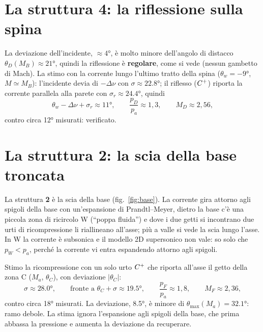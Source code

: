 \section*{La struttura 4: la riflessione sulla spina}

La deviazione dell'incidente, $\approx\ang{4}$, è molto minore dell'angolo di distacco $\theta_D(M_B)\approx\ang{21}$,
quindi la riflessione è \textbf{regolare}, come si vede (nessun gambetto di Mach). La stimo con la corrente lungo
l'ultimo tratto della spina ($\theta_w=\ang{-9}$, $M\simeq M_B$): l'incidente devia di $-\Delta\nu$ con
$\sigma\approx\ang{22.8}$; il riflesso ($C^{+}$) riporta la corrente parallela alla parete con $\sigma_r\approx\ang{24.4}$,
quindi
\[
\theta_w-\Delta\nu+\sigma_r\approx\ang{11},\qquad \frac{p_D}{p_a}\approx1{,}3,\qquad M_D\approx2{,}56 ,
\]
contro circa \ang{12} misurati: verificato.

\section*{La struttura 2: la scia della base troncata}
La struttura \textbf{2} è la scia della base (fig.~\ref{fig:base}). La corrente gira attorno agli spigoli della base con un'espansione di
Prandtl--Meyer, dietro la base c'è una piccola zona di ricircolo W (``poppa fluida'') e dove i due getti si incontrano
due urti di ricompressione li riallineano all'asse; più a valle si vede la scia lungo l'asse. In W la corrente è
subsonica e il modello 2D supersonico non vale: so solo che $p_W<p_a$, perché la corrente vi entra espandendo attorno
agli spigoli.

Stimo la ricompressione con un solo urto $C^{+}$ che riporta all'asse il getto della zona C ($M_a$, $\theta_C$), con
deviazione $|\theta_C|$:
\[
\sigma\approx\ang{28.0},\qquad \text{fronte a }\theta_C+\sigma\approx\ang{19.5},\qquad
\frac{p_F}{p_a}\approx1{,}8,\qquad M_F\approx2{,}36 ,
\]
contro circa \ang{18} misurati. La deviazione, \ang{8.5}, è minore di $\theta_{\max}(M_a)=\ang{32.1}$: ramo debole. La
stima ignora l'espansione agli spigoli della base, che prima abbassa la pressione e aumenta la deviazione da recuperare.

